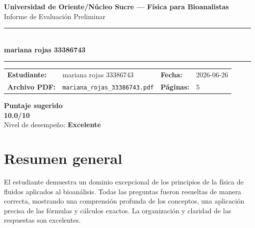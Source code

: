 \documentclass[11pt,a4paper]{article}
\begin{document}
\begin{center}
  {\Large\bfseries\color{azulTitulo} Universidad de Oriente/Núcleo Sucre --- Física para Bioanalistas}\\[4pt]
  {\large Informe de Evaluación Preliminar}\\[12pt]
  \rule{\linewidth}{1.2pt}\\[6pt]
  {\LARGE\bfseries mariana rojas 33386743}\\[4pt]
  \rule{\linewidth}{0.6pt}
\end{center}

\vspace{4pt}
\begin{tcolorbox}[cajaTitulo, title=Datos del informe]
\begin{tabular}{@{}llll@{}}
  \textbf{Estudiante:}  & mariana rojas 33386743  &
  \textbf{Fecha:}       & 2026-06-26 \\[4pt]
  \textbf{Archivo PDF:} & \texttt{mariana\_rojas\_33386743.pdf}  &
  \textbf{Páginas:}     & 5 \\
\end{tabular}
\end{tcolorbox}

\vspace{6pt}
\begin{center}
  \begin{tcolorbox}[
    enhanced,
    colback=white, colframe=desempeno_excelente,
    width=0.62\linewidth,
    boxrule=2pt,
    halign=center, valign=center,
    top=8pt, bottom=8pt,
  ]
    \centering
    {\large\bfseries Puntaje sugerido}\\[6pt]
    {\Huge\bfseries\color{desempeno_excelente} 10.0/10}\\[6pt]
    {\large Nivel de desempeño: \textbf{\color{desempeno_excelente} Excelente}}
  \end{tcolorbox}
\end{center}

\section*{Resumen general}
El estudiante demuestra un dominio excepcional de los principios de la física de fluidos aplicados al bioanálisis. Todas las preguntas fueron resueltas de manera correcta, mostrando una comprensión profunda de los conceptos, una aplicación precisa de las fórmulas y cálculos exactos. La organización y claridad de las respuestas son excelentes.
\end{document}
